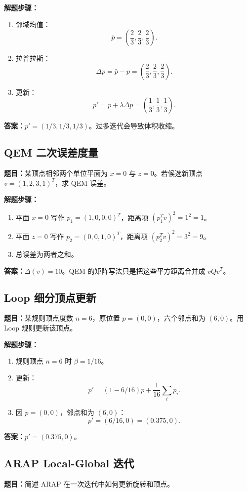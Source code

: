 \documentclass[UTF8,zihao=-4,scheme=chinese,fontset=fandol]{ctexart}
\begin{document}
\textbf{解题步骤：}
\begin{enumerate}
  \item 邻域均值：
  \[
  \bar p=\left(\frac23,\frac23,\frac23\right).
  \]
  \item 拉普拉斯：
  \[
  \Delta p=\bar p-p=\left(\frac23,\frac23,\frac23\right).
  \]
  \item 更新：
  \[
  p'=p+\lambda\Delta p=\left(\frac13,\frac13,\frac13\right).
  \]
\end{enumerate}
\textbf{答案：}$p'=(1/3,1/3,1/3)$。过多迭代会导致体积收缩。

\subsection{QEM 二次误差度量}
\textbf{题目：}某顶点相邻两个单位平面为 $x=0$ 与 $z=0$。若候选新顶点 $v=(1,2,3,1)^T$，求 QEM 误差。

\textbf{解题步骤：}
\begin{enumerate}
  \item 平面 $x=0$ 写作 $p_1=(1,0,0,0)^T$，距离项 $(p_1^Tv)^2=1^2=1$。
  \item 平面 $z=0$ 写作 $p_2=(0,0,1,0)^T$，距离项 $(p_2^Tv)^2=3^2=9$。
  \item 总误差为两者之和。
\end{enumerate}
\textbf{答案：}$\Delta(v)=10$。QEM 的矩阵写法只是把这些平方距离合并成 $vQv^T$。

\subsection{Loop 细分顶点更新}
\textbf{题目：}某规则顶点度数 $n=6$，原位置 $p=(0,0)$，六个邻点和为 $(6,0)$。用 Loop 规则更新该顶点。

\textbf{解题步骤：}
\begin{enumerate}
  \item 规则顶点 $n=6$ 时 $\beta=1/16$。
  \item 更新：
  \[
  p'=(1-6/16)p+\frac1{16}\sum_i p_i.
  \]
  \item 因 $p=(0,0)$，邻点和为 $(6,0)$：
  \[
  p'=(6/16,0)=(0.375,0).
  \]
\end{enumerate}
\textbf{答案：}$p'=(0.375,0)$。

\subsection{ARAP Local-Global 迭代}
\textbf{题目：}简述 ARAP 在一次迭代中如何更新旋转和顶点。
\end{document}
